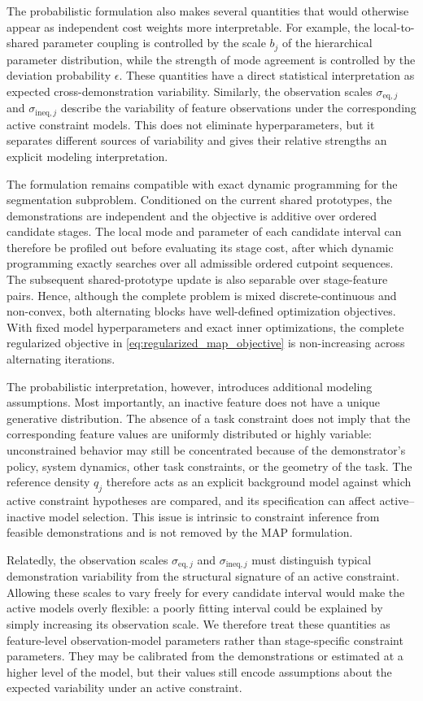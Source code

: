 \documentclass[lettersize,journal]{IEEEtran}
\begin{document}
The probabilistic formulation also makes several quantities that would otherwise
appear as independent cost weights more interpretable. For example, the
local-to-shared parameter coupling is controlled by the scale $b_j$ of the
hierarchical parameter distribution, while the strength of mode agreement is
controlled by the deviation probability $\epsilon$. These quantities have a
direct statistical interpretation as expected cross-demonstration variability.
Similarly, the observation scales
$\sigma_{\mathrm{eq},j}$ and $\sigma_{\mathrm{ineq},j}$ describe the variability
of feature observations under the corresponding active constraint models.
This does not eliminate hyperparameters, but it separates different sources of
variability and gives their relative strengths an explicit modeling
interpretation.

The formulation remains compatible with exact dynamic programming for the
segmentation subproblem. Conditioned on the current shared prototypes, the
demonstrations are independent and the objective is additive over ordered
candidate stages. The local mode and parameter of each candidate interval can
therefore be profiled out before evaluating its stage cost, after which dynamic
programming exactly searches over all admissible ordered cutpoint sequences.
The subsequent shared-prototype update is also separable over stage-feature
pairs. Hence, although the complete problem is mixed discrete-continuous and
non-convex, both alternating blocks have well-defined optimization objectives.
With fixed model hyperparameters and exact inner optimizations, the complete
regularized objective in \eqref{eq:regularized_map_objective} is non-increasing
across alternating iterations.

The probabilistic interpretation, however, introduces additional modeling
assumptions. Most importantly, an inactive feature does not have a unique
generative distribution. The absence of a task constraint does not imply that
the corresponding feature values are uniformly distributed or highly variable:
unconstrained behavior may still be concentrated because of the demonstrator's
policy, system dynamics, other task constraints, or the geometry of the task.
The reference density $q_j$ therefore acts as an explicit background model
against which active constraint hypotheses are compared, and its specification
can affect active--inactive model selection. This issue is intrinsic to
constraint inference from feasible demonstrations and is not removed by the MAP
formulation.

Relatedly, the observation scales
$\sigma_{\mathrm{eq},j}$ and $\sigma_{\mathrm{ineq},j}$ must distinguish typical
demonstration variability from the structural signature of an active
constraint. Allowing these scales to vary freely for every candidate interval
would make the active models overly flexible: a poorly fitting interval could
be explained by simply increasing its observation scale. We therefore treat
these quantities as feature-level observation-model parameters rather than
stage-specific constraint parameters. They may be calibrated from the
demonstrations or estimated at a higher level of the model, but their values
still encode assumptions about the expected variability under an active
constraint.
\end{document}
